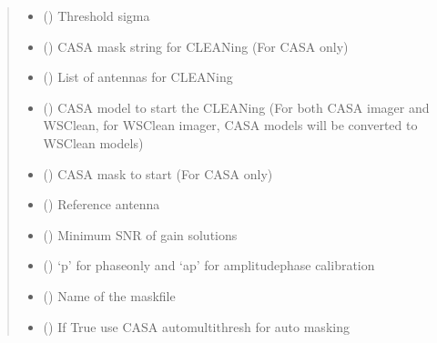 \documentclass[letterpaper,10pt,english]{sphinxmanual}
\begin{document}
\begin{fulllineitems}
\begin{fulllineitems}
\begin{quote}
\begin{description}
\begin{itemize}
\item {} 
\sphinxAtStartPar
{} () \textendash{} Threshold sigma

\item {} 
\sphinxAtStartPar
{} () \textendash{} CASA mask string for CLEANing (For CASA only)

\item {} 
\sphinxAtStartPar
{} () \textendash{} List of antennas for CLEANing

\item {} 
\sphinxAtStartPar
{} () \textendash{} CASA model to start the CLEANing (For both CASA imager and WSClean, for WSClean imager, CASA models will be converted to WSClean models)

\item {} 
\sphinxAtStartPar
{} () \textendash{} CASA mask to start (For CASA only)

\item {} 
\sphinxAtStartPar
{} () \textendash{} Reference antenna

\item {} 
\sphinxAtStartPar
{} () \textendash{} Minimum SNR of gain solutions

\item {} 
\sphinxAtStartPar
{} () \textendash{} ‘p’ for phase\sphinxhyphen{}only and ‘ap’ for amplitude\sphinxhyphen{}phase calibration

\item {} 
\sphinxAtStartPar
{} () \textendash{} Name of the maskfile

\item {} 
\sphinxAtStartPar
{} () \textendash{} If True use CASA auto\sphinxhyphen{}multithresh for auto masking


\end{itemize}
\end{description}
\end{quote}
\end{fulllineitems}
\end{fulllineitems}
\end{document}
